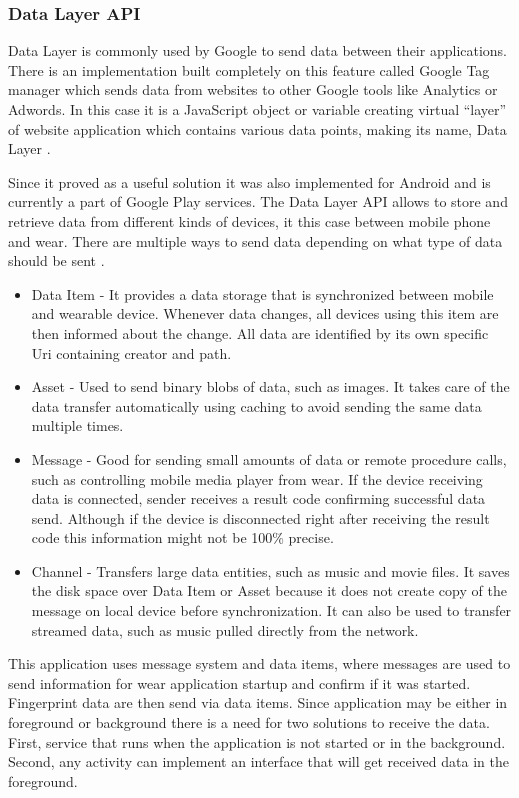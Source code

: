\subsubsection{Data Layer API}\label{subsec:DataLayerAPI}
Data Layer is commonly used by Google to send data between their applications. There is an implementation built completely on this feature called Google Tag manager which sends data from websites to other Google tools like Analytics or Adwords. In this case it is a JavaScript object or variable creating virtual \enquote{layer} of website application which contains various data points, making its name, Data Layer \cite{GTMDL}.

Since it proved as a useful solution it was also implemented for Android and is currently a part of Google Play services. The Data Layer API allows to store and retrieve data from different kinds of devices, it this case between mobile phone and wear. There are multiple ways to send data depending on what type of data should be sent \cite{AD}.

\begin{itemize}
	\item Data Item - It provides a data storage that is synchronized between mobile and wearable device. Whenever data changes, all devices using this item are then informed about the change. All data are identified by its own specific Uri containing creator and path.
	\item Asset - Used to send binary blobs of data, such as images. It takes care of the data transfer automatically using caching to avoid sending the same data multiple times.
	\item Message - Good for sending small amounts of data or remote procedure calls, such as controlling mobile media player from wear. If the device receiving data is connected, sender receives a result code confirming successful data send. Although if the device is disconnected right after receiving the result code this information might not be 100\% precise.
	\item Channel - Transfers large data entities, such as music and movie files. It saves the disk space over Data Item or Asset because it does not create copy of the message on local device before synchronization. It can also be used to transfer streamed data, such as music pulled directly from the network.
\end{itemize}

This application uses message system and data items, where messages are used to send information for wear application startup and confirm if it was started. Fingerprint data are then send via data items. Since application may be either in foreground or background there is a need for two solutions to receive the data. First, service that runs when the application is not started or in the background. Second, any activity can implement an interface that will get received data in the foreground.

